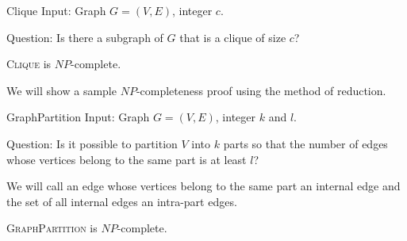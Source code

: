\begin{problem}{Clique}
    Input: Graph $G = (V, E)$, integer $c$.

    Question: Is there a subgraph of $G$ that is a clique of size $c$?
\end{problem}

\begin{thm}
\textsc{Clique} is $NP$-complete.
\end{thm}


We will show a sample $NP$-completeness proof using the method of reduction.

\begin{problem}{GraphPartition}
Input: Graph $G = (V, E)$, integer $k$ and $l$.

Question: Is it possible to partition $V$ into $k$ parts so that the number of edges
whose vertices belong to the same part is at least $l$?
\end{problem}

We will call an edge whose vertices belong to the same part an internal edge
and the set of all internal edges an intra-part edges.

\begin{thm} \label{gp-np}
\textsc{GraphPartition} is $NP$-complete.
\end{thm}

